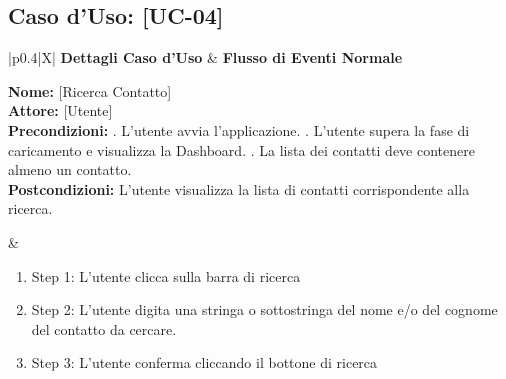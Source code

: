 \documentclass[a4paper,12pt]{article}
\begin{document}
    \subsection*{Caso d'Uso: [UC-04]}

    \begin{table}[htbp]
        \centering
        \begin{tabularx}{\textwidth}{|p{0.4\textwidth}|X|}
            \hline
            \textbf{Dettagli Caso d'Uso} & \textbf{Flusso di Eventi Normale} \\
            \hline
            \parbox[t]{0.38\textwidth}{%
                \textbf{Nome:} [Ricerca Contatto] \\[1ex]
                \textbf{Attore:} [Utente] \\[1ex]
                \textbf{Precondizioni:} . L'utente avvia l'applicazione. . L'utente supera la fase di caricamento e visualizza la Dashboard. . La lista dei contatti deve contenere almeno un contatto. \newline \\[1ex]
                \textbf{Postcondizioni:} \newline L'utente visualizza la lista di contatti corrispondente alla ricerca.\newline
            }
            &
            \parbox[t]{\linewidth}{%
                \begin{enumerate}[noitemsep, leftmargin=*]
                    \item Step 1: L'utente clicca sulla barra di ricerca
                    \item Step 2: L'utente digita una stringa o sottostringa del nome e/o del cognome del contatto da cercare.
                    \item Step 3: L'utente conferma cliccando il bottone di ricerca
                \end{enumerate}
            } \\
            \hline
             \\
            \hline
        \end{tabularx}
        \caption{Ricerca Contatto}
    \end{table}
\end{document}
